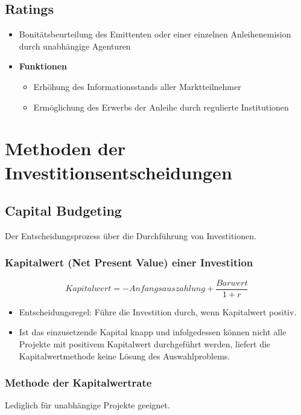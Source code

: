 \subsection{Ratings}
\begin{itemize}
	\item Bonitätsbeurteilung des Emittenten oder einer einzelnen Anleihenemision durch unabhängige Agenturen
	\item \textbf{Funktionen}
	\begin{itemize}
		\item Erhöhung des Informationsstands aller Marktteilnehmer
		\item Ermöglichung des Erwerbs der Anleihe durch regulierte Institutionen
	\end{itemize}
\end{itemize}



\section{Methoden der Investitionsentscheidungen}

\subsection{Capital Budgeting}
Der Entscheidungsprozess über die Durchführung von Investitionen.

\subsubsection{Kapitalwert (Net Present Value) einer Investition}

\[Kapitalwert = -Anfangsauszahlung + \frac{Barwert}{1+r}\]

\begin{itemize}
	\item Entscheidungsregel: Führe die Investition durch, wenn Kapitalwert positiv.
	\item Ist das einzusetzende Kapital knapp und infolgedessen können nicht alle Projekte mit positivem Kapitalwert durchgeführt werden, liefert die Kapitalwertmethode keine Lösung des Auswahlproblems.
\end{itemize}

\subsubsection{Methode der Kapitalwertrate}
Lediglich für unabhängige Projekte geeignet.

